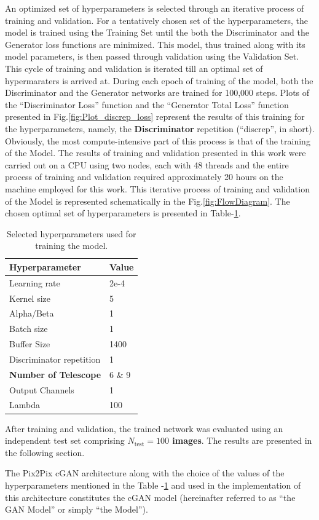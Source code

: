An optimized set of hyperparameters is selected through an iterative process of training and validation. For a tentatively chosen set of the hyperparameters, the model is trained using the Training Set until the both the Discriminator and the Generator loss functions are minimized. This model, thus trained along with its model parameters, is then passed through validation using the Validation Set. This cycle of training and validation is iterated till an optimal set of hypermaraters is arrived at. During each epoch of training of the model, both the Discriminator and the Generator networks are trained for 100,000 steps. Plots of the ``Discriminator Loss'' function and the ``Generator Total Loss'' function presented in Fig.{\ref{fig:Plot_discrep_loss}} represent the results of this training for the hyperparameters, namely, the {\bf Discriminator} repetition (``discrep'', in short). Obviously, the most compute-intensive part of this process is that of the training of the Model. The results of training and validation presented in this work were carried out on a CPU using two nodes, each with 48 threads and the entire process of training and validation required approximately 20 hours on the machine employed for this work. This iterative process of training and validation of the Model is represented schematically in the Fig.\ref{fig:FlowDiagram}. The chosen optimal set of hyperparameters is presented in Table-{\ref{tab:hyperparameters}.}
\begin{table}[ht]
	\centering
	\caption{Selected hyperparameters used for training the model.}
	\label{tab:hyperparameters}
	\begin{tabular}{ll}
		\hline
		\textbf{Hyperparameter} & \textbf{Value} \\
		\hline
		Learning rate           & 2e-4 \\
		Kernel size             & 5 \\
		Alpha/Beta              & 1 \\
		Batch size              & 1 \\
		Buffer Size             & 1400 \\
		Discriminator repetition  & 1 \\
		{\bf Number of Telescope}        & 6 \& 9 \\
		Output Channels         & 1 \\
		Lambda                  & 100 \\
		\hline
	\end{tabular}
\end{table}
After training and validation, the trained network was evaluated using an independent test set comprising {\bf \(N_{\mathrm{test}}=100\) images}. The results are presented in the following section. 

The Pix2Pix cGAN architecture along with the choice of the values of the hyperparameters mentioned in the Table -\ref{tab:hyperparameters} and used in the implementation of this architecture constitutes the cGAN model (hereinafter referred to as ``the GAN Model'' or simply ``the Model'').
